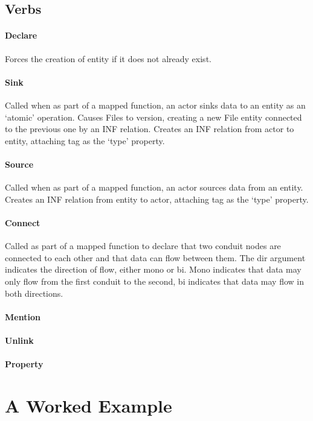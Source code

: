 \documentclass[12pt,twoside,openright,a4paper]{article}
\begin{document}
\subsection{Verbs}

\paragraph{Declare}
Forces the creation of entity if it does not already exist.

\paragraph{Sink}
Called when as part of a mapped function, an actor sinks data to an entity as an ‘atomic’ operation.
Causes Files to version, creating a new File entity connected to the previous one by an INF relation.
Creates an INF relation from actor to entity, attaching tag as the ‘type’ property. 

\paragraph{Source}
Called when as part of a mapped function, an actor sources data from an entity.
Creates an INF relation from entity to actor, attaching tag as the ‘type’ property.

\paragraph{Connect}
Called as part of a mapped function to declare that two conduit nodes are connected to each other and that data can flow between them. The dir argument indicates the direction of flow, either mono or bi. Mono indicates that data may only flow from the first conduit to the second, bi indicates that data may flow in both directions. 

\paragraph{Mention}

\paragraph{Unlink}

\paragraph{Property}

\section{A Worked Example}
\end{document}
